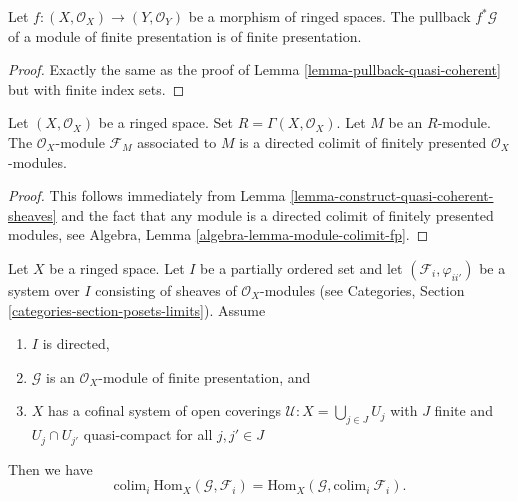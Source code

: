 \begin{lemma}
\label{lemma-pullback-finite-presentation}
Let $f : (X, \mathcal{O}_X) \to (Y, \mathcal{O}_Y)$
be a morphism of ringed spaces.
The pullback $f^*\mathcal{G}$ of a module of finite presentation
is of finite presentation.
\end{lemma}

\begin{proof}
Exactly the same as the proof of Lemma \ref{lemma-pullback-quasi-coherent}
but with finite index sets.
\end{proof}

\begin{lemma}
\label{lemma-quasi-coherent-limit-finite-presentation}
Let $(X, \mathcal{O}_X)$ be a ringed space.
Set $R = \Gamma(X, \mathcal{O}_X)$.
Let $M$ be an $R$-module.
The $\mathcal{O}_X$-module $\mathcal{F}_M$ associated to $M$
is a directed colimit of finitely presented $\mathcal{O}_X$-modules.
\end{lemma}

\begin{proof}
This follows immediately from
Lemma \ref{lemma-construct-quasi-coherent-sheaves}
and the fact that any module is a directed colimit
of finitely presented modules, see
Algebra, Lemma \ref{algebra-lemma-module-colimit-fp}.
\end{proof}

\begin{lemma}
\label{lemma-finite-presentation-quasi-compact-colimit}
Let $X$ be a ringed space.
Let $I$ be a partially ordered set and
let $(\mathcal{F}_i, \varphi_{ii'})$ be a system over $I$
consisting of sheaves of $\mathcal{O}_X$-modules
(see Categories, Section \ref{categories-section-posets-limits}).
Assume
\begin{enumerate}
\item $I$ is directed,
\item $\mathcal{G}$ is an $\mathcal{O}_X$-module of finite presentation, and
\item $X$ has a cofinal system of open coverings
$\mathcal{U} : X = \bigcup_{j\in J} U_j$ with
$J$ finite and $U_j \cap U_{j'}$ quasi-compact
for all $j, j' \in J$
\end{enumerate}
Then we have
$$
\text{colim}_i\ \text{Hom}_X(\mathcal{G}, \mathcal{F}_i)
=
\text{Hom}_X(\mathcal{G}, \text{colim}_i\ \mathcal{F}_i).
$$
\end{lemma}

